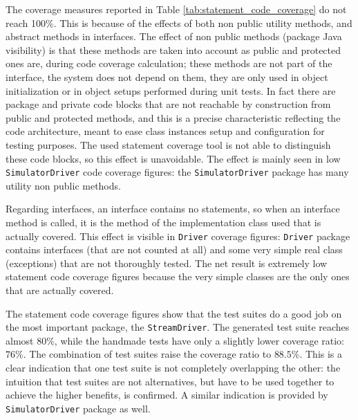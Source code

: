 \documentclass{article}
\newcommand{\lil}[1]{\texttt{\lstinline|#1|}}
\begin{document}
The coverage measures reported in Table \ref{tab:statement_code_coverage} do not reach 100\%. 
This is because of the effects of both non public utility methods, and abstract methods in interfaces.
The effect of non public methods (package Java visibility) is that these methods are taken into account as public and protected ones are, during code coverage calculation; these methods are not part of the interface, the system does not depend on them, they are only used in object initialization or in object setups performed during unit tests. 
In fact there are package and private code blocks that are not reachable by construction from public and protected methods, and this is a precise characteristic reflecting the code architecture, meant to ease class instances setup and configuration for testing purposes. 
The used statement coverage tool is not able to distinguish these code blocks, so this effect is unavoidable. 
The effect is mainly seen in low \lil{SimulatorDriver} code coverage figures: the \lil{SimulatorDriver} package has many utility non public methods.

Regarding interfaces, an interface contains no statements, so when an interface method is called, it is the method of the implementation class used that is actually covered.
This effect is visible in \lil{Driver} coverage figures: \lil{Driver} package contains interfaces (that are not counted at all) and some very simple real class (exceptions) that are not thoroughly tested. 
The net result is extremely low statement code coverage figures because the very simple classes are the only ones that are actually covered. 

The statement code coverage figures show that the test suites do a good job on the most important package, the \lil{StreamDriver}. 
The generated test suite reaches almost $ 80 \% $, while the handmade tests have only a slightly lower coverage ratio: $ 76 \% $. 
The combination of test suites raise the coverage ratio to $ 88.5 \% $. 
This is a clear indication that one test suite is not completely overlapping the other: the intuition that test suites are not alternatives, but have to be used together to achieve the higher benefits, is confirmed.
A similar indication is provided by \lil{SimulatorDriver} package as well.
\end{document}
